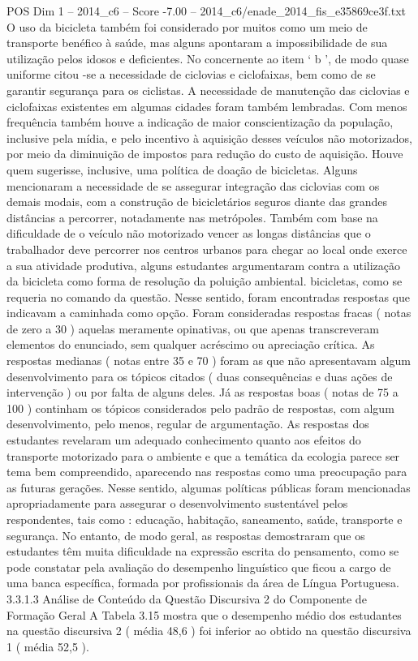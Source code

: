 \begin{textsample}{POS Dim 1 – 2014\_c6 – Score -7.00 – 2014\_c6/enade\_2014\_fis\_e35869ce3f.txt}
O uso da bicicleta também foi considerado por muitos como um meio de transporte benéfico à saúde, mas alguns apontaram a impossibilidade de sua utilização pelos idosos e deficientes.
No concernente ao item ‘ b ’, de modo quase uniforme citou -se a necessidade de ciclovias e ciclofaixas, bem como de se garantir segurança para os ciclistas.
A necessidade de manutenção das ciclovias e ciclofaixas existentes em algumas cidades foram também lembradas.
Com menos frequência também houve a indicação de maior conscientização da população, inclusive pela mídia, e pelo incentivo à aquisição desses veículos não motorizados, por meio da diminuição de impostos para redução do custo de aquisição.
Houve quem sugerisse, inclusive, uma política de doação de bicicletas.
Alguns mencionaram a necessidade de se assegurar integração das ciclovias com os demais modais, com a construção de bicicletários seguros diante das grandes distâncias a percorrer, notadamente nas metrópoles.
Também com base na dificuldade de o veículo não motorizado vencer as longas distâncias que o trabalhador deve percorrer nos centros urbanos para chegar ao local onde exerce a sua atividade produtiva, alguns estudantes argumentaram contra a utilização da bicicleta como forma de resolução da poluição ambiental. bicicletas, como se requeria no comando da questão.
Nesse sentido, foram encontradas respostas que indicavam a caminhada como opção.
Foram consideradas respostas fracas ( notas de zero a 30 ) aquelas meramente opinativas, ou que apenas transcreveram elementos do enunciado, sem qualquer acréscimo ou apreciação crítica.
As respostas medianas ( notas entre 35 e 70 ) foram as que não apresentavam algum desenvolvimento para os tópicos citados ( duas consequências e duas ações de intervenção ) ou por falta de alguns deles.
Já as respostas boas ( notas de 75 a 100 ) continham os tópicos considerados pelo padrão de respostas, com algum desenvolvimento, pelo menos, regular de argumentação.
As respostas dos estudantes revelaram um adequado conhecimento quanto aos efeitos do transporte motorizado para o ambiente e que a temática da ecologia parece ser tema bem compreendido, aparecendo nas respostas como uma preocupação para as futuras gerações.
Nesse sentido, algumas políticas públicas foram mencionadas apropriadamente para assegurar o desenvolvimento sustentável pelos respondentes, tais como : educação, habitação, saneamento, saúde, transporte e segurança.
No entanto, de modo geral, as respostas demostraram que os estudantes têm muita dificuldade na expressão escrita do pensamento, como se pode constatar pela avaliação do desempenho linguístico que ficou a cargo de uma banca específica, formada por profissionais da área de Língua Portuguesa. 3.3.1.3 Análise de Conteúdo da Questão Discursiva 2 do Componente de Formação Geral A Tabela 3.15 mostra que o desempenho médio dos estudantes na questão discursiva 2 ( média 48,6 ) foi inferior ao obtido na questão discursiva 1 ( média 52,5 ).

\end{textsample}
